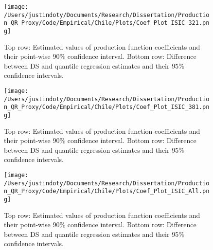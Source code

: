 \documentclass[11pt]{article}
\begin{document}
\begin{figure}[H]
\centering
\texttt{[image: /Users/justindoty/Documents/Research/Dissertation/Production\_QR\_Proxy/Code/Empirical/Chile/Plots/Coef\_Plot\_ISIC\_321.png]}
\caption{Top row: Estimated values of production function coefficients and their point-wise 90\% confidence interval. Bottom row: Difference between DS and quantile regression estimates and their 95\% confidence intervals.}
\label{fig:CHL321}
\end{figure}

\begin{figure}[H]
\centering
\texttt{[image: /Users/justindoty/Documents/Research/Dissertation/Production\_QR\_Proxy/Code/Empirical/Chile/Plots/Coef\_Plot\_ISIC\_381.png]}
\caption{Top row: Estimated values of production function coefficients and their point-wise 90\% confidence interval. Bottom row: Difference between DS and quantile regression estimates and their 95\% confidence intervals.}
\label{fig:CHL381}
\end{figure}

\begin{figure}[H]
\centering
\texttt{[image: /Users/justindoty/Documents/Research/Dissertation/Production\_QR\_Proxy/Code/Empirical/Chile/Plots/Coef\_Plot\_ISIC\_All.png]}
\caption{Top row: Estimated values of production function coefficients and their point-wise 90\% confidence interval. Bottom row: Difference between DS and quantile regression estimates and their 95\% confidence intervals.}
\label{fig:CHLall}
\end{figure}
\end{document}
